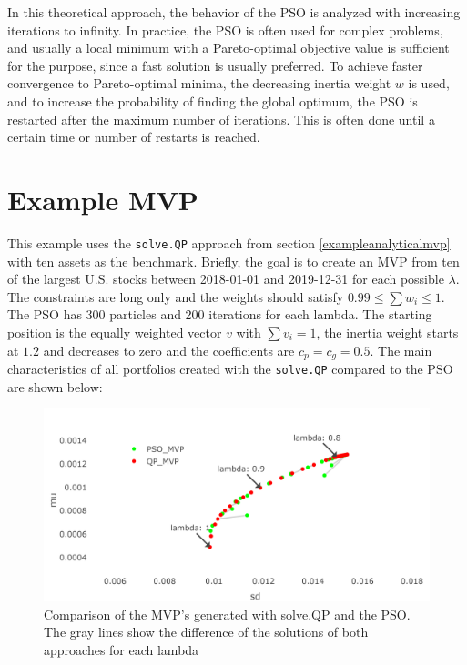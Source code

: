 \documentclass[
  oneside, a4paper, 12pt, openany]{book}
\theoremstyle{definition}
\theoremstyle{definition}
\theoremstyle{definition}
\theoremstyle{definition}
\theoremstyle{remark}
\begin{document}
In this theoretical approach, the behavior of the PSO is analyzed with increasing iterations to infinity. In practice, the PSO is often used for complex problems, and usually a local minimum with a Pareto-optimal objective value is sufficient for the purpose, since a fast solution is usually preferred. To achieve faster convergence to Pareto-optimal minima, the decreasing inertia weight \(w\) is used, and to increase the probability of finding the global optimum, the PSO is restarted after the maximum number of iterations. This is often done until a certain time or number of restarts is reached.

\hypertarget{example-mvp-1}{%
\section{Example MVP}\label{example-mvp-1}}

This example uses the \texttt{solve.QP} approach from section \ref{exampleanalyticalmvp} with ten assets as the benchmark. Briefly, the goal is to create an MVP from ten of the largest U.S. stocks between 2018-01-01 and 2019-12-31 for each possible \(\lambda\). The constraints are long only and the weights should satisfy \(0.99 \leq \textstyle\sum w_i \leq 1\). The PSO has 300 particles and 200 iterations for each lambda. The starting position is the equally weighted vector \(v\) with \(\textstyle\sum v_i=1\), the inertia weight starts at \(1.2\) and decreases to zero and the coefficients are \(c_p=c_g=0.5\). The main characteristics of all portfolios created with the \texttt{solve.QP} compared to the PSO are shown below:

\vspace{-0,1cm}
\begin{figure}[H]
\includegraphics{Master_Thesis_files/figure-latex/pso7-1} \caption{Comparison of the MVP's generated with solve.QP and the PSO. The gray lines show the difference of the solutions of both approaches for each lambda}\label{fig:pso7}
\end{figure}
\end{document}
